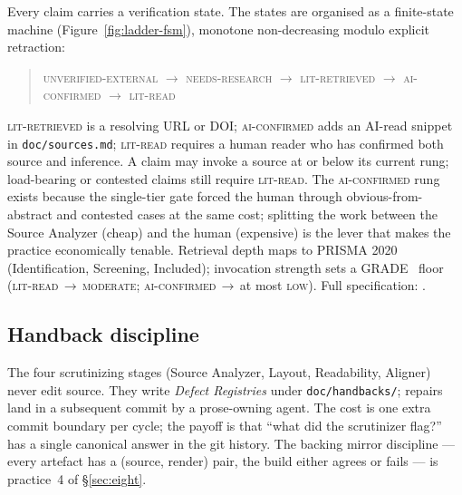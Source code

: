 Every claim carries a verification state. The states are organised
as a finite-state machine (Figure~\ref{fig:ladder-fsm}), monotone
non-decreasing modulo explicit retraction:

\begin{quote}\small
\textsc{unverified-external}
\(\to\) \textsc{needs-research}
\(\to\) \textsc{lit-retrieved}
\(\to\) \textsc{ai-confirmed}
\(\to\) \textsc{lit-read}
\end{quote}

\noindent \textsc{lit-retrieved} is a resolving URL or DOI;
\textsc{ai-confirmed} adds an AI-read snippet in
\texttt{doc/sources.md}; \textsc{lit-read} requires a human reader
who has confirmed both source and inference. A claim may invoke a
source at or below its current rung; load-bearing or contested
claims still require \textsc{lit-read}. The
\textsc{ai-confirmed} rung exists because the single-tier gate
forced the human through obvious-from-abstract and contested cases
at the same cost; splitting the work between the Source Analyzer
(cheap) and the human (expensive) is the lever that makes the
practice economically tenable. Retrieval depth maps to PRISMA
2020~\cite{page2021prisma} (Identification, Screening, Included);
invocation strength sets a GRADE~\cite{guyatt2008grade} floor
(\textsc{lit-read}\,\(\to\)\,\textsc{moderate};
\textsc{ai-confirmed}\,\(\to\)\,at most \textsc{low}). Full
specification: .

\subsection{Handback discipline}
\label{sec:handback}

The four scrutinizing stages (Source Analyzer, Layout, Readability,
Aligner) never edit source. They write \emph{Defect Registries}
under \texttt{doc/handbacks/}; repairs land in a subsequent commit
by a prose-owning agent. The cost is one extra commit boundary per
cycle; the payoff is that ``what did the scrutinizer flag?'' has a
single canonical answer in the git history. The backing mirror
discipline --- every artefact has a (source, render) pair, the
build either agrees or fails --- is practice~4 of
\S\ref{sec:eight}.



